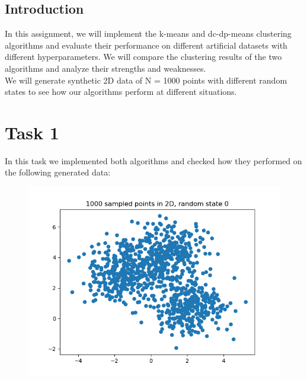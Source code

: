 \documentclass[12pt]{article}
\begin{document}
\maketitle
\begin{center}
\section*{Introduction}\label{sec:introduction}
\end{center}
In this assignment, we will implement the k-means and dc-dp-means clustering algorithms and evaluate their performance on different artificial datasets with different hyperparameters. We will compare the clustering results of the two algorithms and analyze their strengths and weaknesses.
\\
We will generate synthetic 2D data of N = 1000 points with different random states to see how our algorithms perform at different situations.
\\
\section*{Task 1}\label{sec:task-1}
In this task we implemented both algorithms and checked how they performed on the following generated data:

\begin{figure}[!h]
    \centering
    \includegraphics[scale=0.5]{images/data_0}\label{fig:figure2}
\end{figure}
\end{document}
